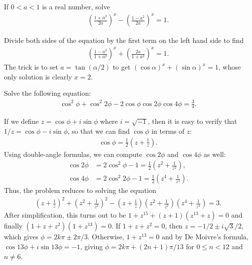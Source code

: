 \begin{tcolorbox}
    \begin{question}
        If $0<a<1$ is a real number, solve
        \begin{align*}
            \left(\frac{1+a^2}{2a}\right)^x-\left(\frac{1-a^2}{2a}\right)^x=1.
        \end{align*}
    \end{question}
\end{tcolorbox}

\begin{solution}
    Divide both sides of the equation by the first term on the left hand side to find
    \begin{align*}
        \left(\frac{1-a^2}{1+a^2}\right)^x+\left(\frac{2a}{1+a^2}\right)^x=1.
    \end{align*}
    The trick is to set $a=\tan(\alpha/2)$ to get $(\cos \alpha)^x +  (\sin\alpha)^x=1$, whose only solution is clearly $x=2$.
\end{solution}

\begin{tcolorbox}
    \begin{question}
        Solve the following equation:
        \begin{align*}
            \cos^2\phi + \cos^2 2\phi - 2 \cos \phi \cos 2\phi \cos 4\phi = \frac{3}{4}.
        \end{align*}
    \end{question}
\end{tcolorbox}

\begin{solution}
    If we define $z=\cos \phi + i\sin \phi$ where $i=\sqrt{-1}$, then it is easy to verify that $1/z = \cos \phi - i \sin \phi$, so that we can find $\cos\phi$ in terms of $z$:
    \begin{align*}
        \cos\phi=\frac{1}{2}\left(z+\frac{1}{z}\right).
    \end{align*}
    Using double-angle formulas, we can compute $\cos 2\phi$ and $\cos 4\phi$ as well:
    \begin{align*}
        \cos 2\phi &= 2\cos^2\phi -1 = \frac{1}{2}\left(z^2+\frac{1}{z^2}\right),\\
        \cos 4\phi &= 2\cos^2 2\phi -1 = \frac{1}{2}\left(z^4+\frac{1}{z^4}\right).
    \end{align*}
    Thus, the problem reduces to solving the equation
    \begin{align*}
        \left(z+\frac{1}{z}\right)^2 + \left(z^2+\frac{1}{z^2}\right)^2 - \left(z+\frac{1}{z}\right)\left(z^2+\frac{1}{z^2}\right)\left(z^4+\frac{1}{z^4}\right) = 3.
    \end{align*}
    After simplification, this turns out to be $1+z^{15} + (z+1)(z^{13}+z)=0$ and finally $(1+z+z^2)(1+z^{13})=0$. If $1+z+z^2=0$, then $z=-1/2\pm i\sqrt 3/2$, which gives $\phi = 2k\pi\pm 2\pi/3$. Otherwise, $1+z^{13}=0$ and by De Moivre's formula, $\cos 13\phi + i\sin 13\phi = -1$, giving $\phi = 2k\pi + (2n+1)\pi/13$ for $0 \leq n < 12$ and $n\neq 6$.
\end{solution}


